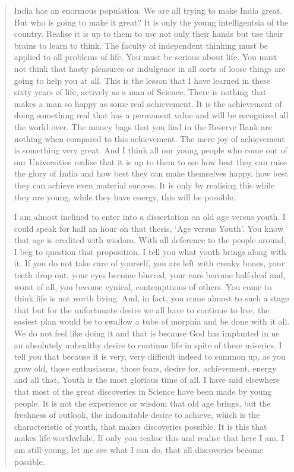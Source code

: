 \begin{quote}
{India has an enormous population. We are all trying to make India great. But who is going to make it great? It is only the young intelligentsia of the country. Realise it is up to them to use not only their hands but use their brains to learn to think. The faculty of independent thinking must be applied to all problems of life. You must be serious about life. You must not think that hasty pleasures or indulgence in all sorts of loose things are going to help you at all. This is the lesson that I have learned in these sixty years of life, actively as a man of Science. There is nothing that makes a man so happy as some real achievement. It is the achievement of doing something real that has a permanent value and will be recognized all the world over. The money bags that you find in the Reserve Bank are nothing when compared to this achievement. The mere joy of achievement is something very great. And I think all our young people who come out of our Universities realise that it is up to them to see how best they can raise the glory of India and how best they can make themselves happy, how best they can achieve even material success. It is only by realising this while they are young, while they have energy, this will be possible.

I am almost inclined to enter into a dissertation on old age versus youth. I could speak for half an hour on that thesis, `Age versus Youth'. You know that age is credited with wisdom. With all deference to the people around, I beg to question that proposition. I tell you what youth brings along with it. If you do not take care of yourself, you are left with creaky bones, your teeth drop out, your eyes become blurred, your ears become half-deaf and, worst of all, you become cynical, contemptuous of others. You come to think life is not worth living. And, in fact, you come almost to such a stage that but for the unfortunate desire we all have to continue to live, the easiest plan would be to swallow a tube of morphia and be done with it all. We do not feel like doing it and that is because God has implanted in us an absolutely unhealthy desire to continue life in spite of these miseries. I tell you that because it is very, very difficult indeed to summon up, as you grow old, those enthusiasms, those fears, desire for, achievement, energy and all that. Youth is the most glorious time of all. I have said elsewhere that most of the great discoveries in Science have been made by young people. It is not the experience or wisdom that old age brings, but the freshness of outlook, the indomitable desire to achieve, which is the characteristic of youth, that makes discoveries possible. It is this that makes life worthwhile. If only you realise this and realise that here I am, I am still young, let me see what I can do, that all discoveries become possible.
}\relax
\end{quote}

